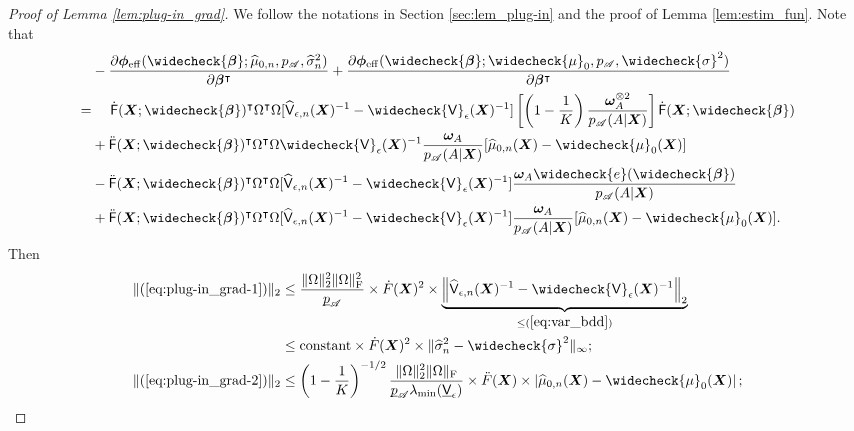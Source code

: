 \documentclass[11pt]{article}
\numberwithin{equation}{section}
\theoremstyle{definition}
\theoremstyle{remark}
\newcommand{\bX}{\bm{X}}
\newcommand{\bbeta}{\bm{\beta}}
\newcommand{\bomega}{\bm{\omega}}
\newcommand{\bphi}{\bm{\phi}}
\newcommand{\sA}{\mathscr{A}}
\newcommand{\sfF}{\mathsf{F}}
\newcommand{\sfV}{\mathsf{V}}
\def\ubar#1{\underbar{$ #1 $}}
\newcommand{\eff}{\mathrm{eff}}
\begin{document}
\begin{proof}[Proof of Lemma \ref{lem:plug-in_grad}]
	We follow the notations in Section \ref{sec:lem_plug-in} and the proof of Lemma \ref{lem:estim_fun}. Note that
	\begin{align}
		&- {\partial \bphi_{\eff}(\widecheck{\bbeta};\widehat{\mu}_{0,n},p_{\sA},\widehat{\sigma}_{n}^{2})\over \partial \bbeta^{\intercal}} + {\partial \bphi_{\eff}(\widecheck{\bbeta};\widecheck{\mu}_{0},p_{\sA},\widecheck{\sigma}^{2})\over \partial \bbeta^{\intercal}} \nonumber \\
		=&\quad~ \dot{\sfF}(\bX;\widecheck{\bbeta})^{\intercal}\Omega^{\intercal}\Omega[\widehat{\sfV}_{\epsilon,n}(\bX)^{-1} - \widecheck{\sfV}_{\epsilon}(\bX)^{-1}]\left[ \left( 1 - {1 \over K} \right) {\bomega_{A}^{\otimes 2}\over p_{\sA}(A|\bX)} \right]\dot{\sfF}(\bX;\widecheck{\bbeta})\label{eq:plug-in_grad-1}\\
		& +\ddot{\sfF}(\bX;\widecheck{\bbeta})^{\intercal}\Omega^{\intercal}\Omega\widecheck{\sfV}_{\epsilon}(\bX)^{-1}{\bomega_{A} \over p_{\sA}(A|\bX)}[\widehat{\mu}_{0,n}(\bX) - \widecheck{\mu}_{0}(\bX)] \label{eq:plug-in_grad-2}\\
		& - \ddot{\sfF}(\bX;\widecheck{\bbeta})^{\intercal}\Omega^{\intercal}\Omega[\widehat{\sfV}_{\epsilon,n}(\bX)^{-1} - \widecheck{\sfV}_{\epsilon}(\bX)^{-1}]{\bomega_{A}\widecheck{e}(\widecheck{\bbeta}) \over p_{\sA}(A|\bX)} \label{eq:plug-in_grad-3}\\
		& + \ddot{\sfF}(\bX;\widecheck{\bbeta})^{\intercal}\Omega^{\intercal}\Omega[\widehat{\sfV}_{\epsilon,n}(\bX)^{-1} - \widecheck{\sfV}_{\epsilon}(\bX)^{-1}]{\bomega_{A} \over p_{\sA}(A|\bX)}[\widehat{\mu}_{0,n}(\bX) - \widecheck{\mu}_{0}(\bX)]. \label{eq:plug-in_grad-4}
	\end{align}
	Then
	\begin{align*}
		\| (\ref{eq:plug-in_grad-1}) \|_{2} &\le {\| \Omega \|_{2}^{2}\| \Omega \|_{\rm F}^{2} \over \ubar{p}_{\sA}} \times \dot{F}(\bX)^{2} \times \underbrace{\left \| \widehat{\sfV}_{\epsilon,n}(\bX)^{-1} - \widecheck{\sfV}_{\epsilon}(\bX)^{-1} \right \|_{2}}_{\le (\ref{eq:var_bdd})}\\
		&\le \text{constant} \times \dot{F}(\bX)^{2} \times \| \widehat{\sigma}_{n}^{2} - \widecheck{\sigma}^{2} \|_{\infty};\\
		\| (\ref{eq:plug-in_grad-2}) \|_{2} &\le \left( 1 - {1 \over K} \right)^{-1/2}{\|\Omega\|_{2}^{2}\| \Omega \|_{\rm F} \over \ubar{p}_{\sA}\lambda_{\min}(\ubar{\sfV}_{\epsilon})} \times \ddot{F}(\bX) \times \left| \widehat{\mu}_{0,n}(\bX) - \widecheck{\mu}_{0}(\bX) \right|;\\

\end{align*}
\end{proof}
\end{document}

